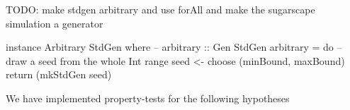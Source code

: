 TODO: make stdgen arbitrary and use forAll and make the sugarscape simulation a generator

\begin{HaskellCode}
instance Arbitrary StdGen where
  -- arbitrary :: Gen StdGen
  arbitrary = do
  	-- draw a seed from the whole Int range
    seed <- choose (minBound, maxBound) 
    return (mkStdGen seed)
\end{HaskellCode}


We have implemented property-tests for the following hypotheses

